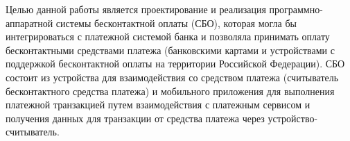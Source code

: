 Целью данной работы является проектирование и реализация программно-аппаратной системы бесконтактной оплаты (СБО), которая могла бы интегрироваться с платежной системой банка и позволяла принимать оплату бесконтактными средствами платежа (банковскими картами и устройствами с поддержкой бесконтактной оплаты на территории Российской Федерации).
СБО состоит из устройства для взаимодействия со средством платежа (считыватель бесконтактного средства платежа) и мобильного приложения для выполнения платежной транзакцией путем взаимодействия с платежным сервисом и получения данных для транзакции от средства платежа через устройство-считыватель.
